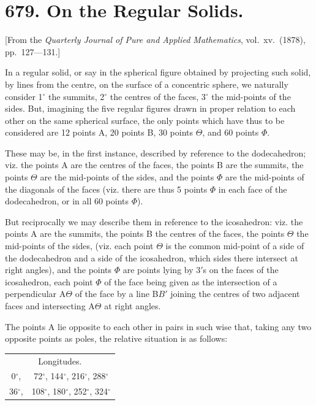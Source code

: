 \documentclass[11pt,a4paper]{book}
\begin{document}
\newpage

\section*{679. On the Regular Solids.}

[From the \textit{Quarterly Journal of Pure and Applied Mathematics}, vol.\ xv.\ (1878), pp.\ 127---131.]

In a regular solid, or say in the spherical figure obtained by projecting such solid, by lines from the centre, on the surface of a concentric sphere, we naturally consider 1$^\circ$ the summits, 2$^\circ$ the centres of the faces, 3$^\circ$ the mid-points of the sides. But, imagining the five regular figures drawn in proper relation to each other on the same spherical surface, the only points which have thus to be considered are 12 points A, 20 points B, 30 points $\Theta$, and 60 points $\Phi$.

These may be, in the first instance, described by reference to the dodecahedron; viz. the points A are the centres of the faces, the points B are the summits, the points $\Theta$ are the mid-points of the sides, and the points $\Phi$ are the mid-points of the diagonals of the faces (viz. there are thus 5 points $\Phi$ in each face of the dodecahedron, or in all 60 points $\Phi$).

But reciprocally we may describe them in reference to the icosahedron: viz. the points A are the summits, the points B the centres of the faces, the points $\Theta$ the mid-points of the sides, (viz. each point $\Theta$ is the common mid-point of a side of the dodecahedron and a side of the icosahedron, which sides there intersect at right angles), and the points $\Phi$ are points lying by 3$'$s on the faces of the icosahedron, each point $\Phi$ of the face being given as the intersection of a perpendicular A$\Theta$ of the face by a line B$B'$ joining the centres of two adjacent faces and intersecting A$\Theta$ at right angles.

The points A lie opposite to each other in pairs in such wise that, taking any two opposite points as poles, the relative situation is as follows:

\begin{center}
\begin{tabular}{cc}
\multicolumn{2}{c}{Longitudes.} \\
0$^\circ$, & 72$^\circ$, 144$^\circ$, 216$^\circ$, 288$^\circ$ \\
36$^\circ$, & 108$^\circ$, 180$^\circ$, 252$^\circ$, 324$^\circ$ \\
\end{tabular}
\end{center}
\end{document}
